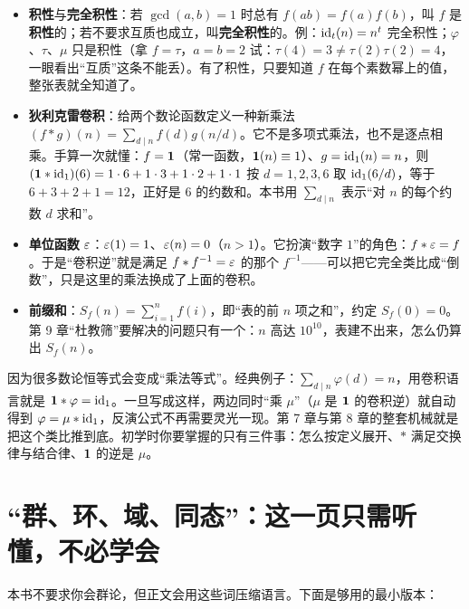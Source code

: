 \begin{itemize}
\item \textbf{积性}与\textbf{完全积性}：若 $\gcd(a,b)=1$ 时总有 $f(ab)=f(a)f(b)$，叫 $f$ 是\textbf{积性}的；若不要求互质也成立，叫\textbf{完全积性}的。例：$\operatorname{id}_t(n)=n^t$ 完全积性；$\varphi$、$\tau$、$\mu$ 只是积性（拿 $f=\tau$，$a=b=2$ 试：$\tau(4)=3\ne\tau(2)\tau(2)=4$，一眼看出“互质”这条不能丢）。有了积性，只要知道 $f$ 在每个素数幂上的值，整张表就全知道了。
\item \textbf{狄利克雷卷积}：给两个数论函数定义一种新乘法
$(f*g)(n)=\sum_{d\mid n}f(d)g(n/d)$。它不是多项式乘法，也不是逐点相乘。手算一次就懂：$f=\mathbf 1$（常一函数，$\mathbf 1(n)\equiv1$）、$g=\operatorname{id}_1(n)=n$，则 $(\mathbf 1*\operatorname{id}_1)(6)=1\cdot6+1\cdot3+1\cdot2+1\cdot1$ 按 $d=1,2,3,6$ 取 $\operatorname{id}_1(6/d)$，等于 $6+3+2+1=12$，正好是 $6$ 的约数和。本书用 $\sum_{d\mid n}$ 表示“对 $n$ 的每个约数 $d$ 求和”。
\item \textbf{单位函数} $\varepsilon$：$\varepsilon(1)=1$、$\varepsilon(n)=0$（$n>1$）。它扮演“数字 $1$”的角色：$f*\varepsilon=f$。于是“卷积逆”就是满足 $f*f^{-1}=\varepsilon$ 的那个 $f^{-1}$——可以把它完全类比成“倒数”，只是这里的乘法换成了上面的卷积。
\item \textbf{前缀和}：$S_f(n)=\sum_{i=1}^{n}f(i)$，即“表的前 $n$ 项之和”，约定 $S_f(0)=0$。第 9 章“杜教筛”要解决的问题只有一个：$n$ 高达 $10^{10}$，表建不出来，怎么仍算出 $S_f(n)$。
\end{itemize}

\begin{tip}
因为很多数论恒等式会变成“乘法等式”。经典例子：$\sum_{d\mid n}\varphi(d)=n$，用卷积语言就是 $\mathbf 1*\varphi=\operatorname{id}_1$。一旦写成这样，两边同时“乘 $\mu$”（$\mu$ 是 $\mathbf 1$ 的卷积逆）就自动得到 $\varphi=\mu*\operatorname{id}_1$，反演公式不再需要灵光一现。第 7 章与第 8 章的整套机械就是把这个类比推到底。初学时你要掌握的只有三件事：怎么按定义展开、$*$ 满足交换律与结合律、$\mathbf 1$ 的逆是 $\mu$。
\end{tip}

\section{“群、环、域、同态”：这一页只需听懂，不必学会}
本书不要求你会群论，但正文会用这些词压缩语言。下面是够用的最小版本：

